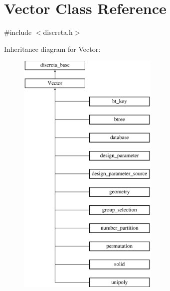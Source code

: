 \hypertarget{class_vector}{}\section{Vector Class Reference}
\label{class_vector}


{\ttfamily \#include $<$discreta.\+h$>$}

Inheritance diagram for Vector\+:\begin{figure}[H]
\begin{center}
\leavevmode
\includegraphics[height=12.000000cm]{class_vector}
\end{center}
\end{figure}
